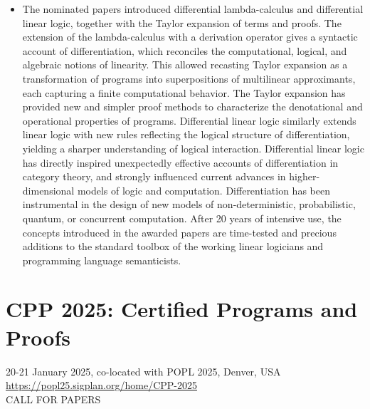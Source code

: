 \documentclass[prodmode,acmtecs]{acmsmall} %
\begin{document}
\begin{itemize}
\item  The nominated papers introduced differential lambda-calculus and differential linear logic, together with the Taylor expansion of terms and proofs. The extension of the lambda-calculus with a derivation operator gives a syntactic account of differentiation, which reconciles the computational, logical, and algebraic notions of linearity. This allowed recasting Taylor expansion as a transformation of programs into superpositions of multilinear approximants, each capturing a finite computational behavior. The Taylor expansion has provided new and simpler proof methods to characterize the denotational and operational properties of programs. Differential linear logic similarly extends linear logic with new rules reflecting the logical structure of differentiation, yielding a sharper understanding of logical interaction. Differential linear logic has directly inspired unexpectedly effective accounts of differentiation in category theory, and strongly influenced current advances in higher-dimensional models of logic and computation. Differentiation has been instrumental in the design of new models of non-deterministic, probabilistic, quantum, or concurrent computation. After 20 years of intensive use, the concepts introduced in the awarded papers are time-tested and precious additions to the standard toolbox of the working linear logicians and programming language semanticists. 
 
\end{itemize}\section{CPP 2025: Certified Programs and Proofs}\label{CPP2025}  20-21 January 2025, co-located with POPL 2025, Denver, USA\\ 
  \href{https://popl25.sigplan.org/home/CPP-2025}{https://popl25.sigplan.org/home/CPP-2025}\\ 
CALL FOR PAPERS 
\end{document}
